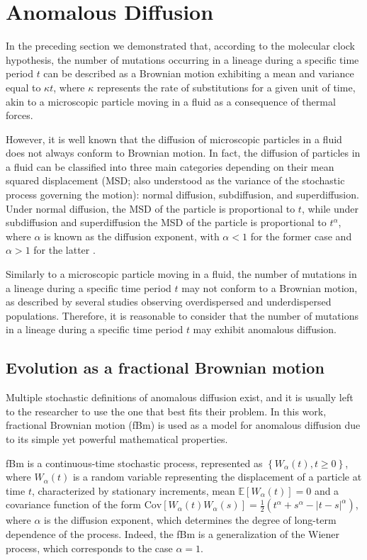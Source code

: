 \documentclass{./LatexTemplate/svproc}
\begin{document}
%
\section{Anomalous Diffusion}
%

In the preceding section we demonstrated that, according to the molecular clock hypothesis, the number of mutations occurring in a lineage during a specific time period $t$ can be described as a Brownian motion exhibiting a mean and variance equal to $\kappa t$, where $\kappa$ represents the rate of substitutions for a given unit of time, akin to a microscopic particle moving in a fluid as a consequence of thermal forces.

However, it is well known that the diffusion of microscopic particles in a fluid does not always conform to Brownian motion. In fact, the diffusion of particles in a fluid can be classified into three main categories depending on their mean squared displacement (MSD; also understood as the variance of the stochastic process governing the motion): normal diffusion, subdiffusion, and superdiffusion. Under normal diffusion, the MSD of the particle is proportional to $t$, while under subdiffusion and superdiffusion the MSD of the particle is proportional to $t^\alpha$, where $\alpha$ is known as the diffusion exponent, with $\alpha < 1$ for the former case and $\alpha > 1$ for the latter \cite{munoz2021}.

Similarly to a microscopic particle moving in a fluid, the number of mutations in a lineage during a specific time period $t$ may not conform to a Brownian motion, as described by several studies observing overdispersed and underdispersed populations. Therefore, it is reasonable to consider that the number of mutations in a lineage during a specific time period $t$ may exhibit anomalous diffusion.

%
\subsection{Evolution as a fractional Brownian motion}
%

Multiple stochastic definitions of anomalous diffusion exist, and it is usually left to the researcher to use the one that best fits their problem. In this work, fractional Brownian motion (fBm) is used as a model for anomalous diffusion due to its simple yet powerful mathematical properties.

fBm is a continuous-time stochastic process, represented as $\left\{W_\alpha(t), t \geq 0\right\}$, where $W_\alpha(t)$ is a random variable representing the displacement of a particle at time $t$, characterized by stationary increments, mean $\mathbb{E}\left[W_\alpha(t)\right]=0$ and a covariance function of the form $\text{Cov}\left[W_\alpha(t)W_\alpha(s)\right] = \frac{1}{2}\left(t^\alpha + s^\alpha - |t-s|^\alpha\right)$, where $\alpha$ is the diffusion exponent, which determines the degree of long-term dependence of the process. Indeed, the fBm is a generalization of the Wiener process, which corresponds to the case $\alpha = 1$.
\end{document}
